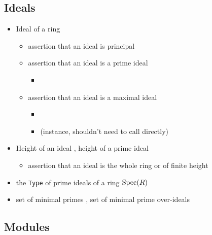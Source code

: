 \subsection{Ideals}

\begin{itemize}
\item
Ideal of a ring 
\begin{itemize}
\item
assertion that an ideal is principal 
\item
assertion that an ideal is a prime ideal 
\begin{itemize}
\item
{}
\end{itemize}
\item
assertion that an ideal is a maximal ideal 
\begin{itemize}
\item
{}
\item
{} (instance, shouldn't need to call directly)
\end{itemize}
\end{itemize}
\item
Height of an ideal ,
height of a prime ideal 
\begin{itemize}
\item
assertion that an ideal is the whole ring or of finite height 
\end{itemize}
\item
the \verb|Type| of prime ideals of a ring ${\mathrm{Spec}}(R)$ 
\item
set of minimal primes ,
set of minimal prime over-ideals 
\end{itemize}

\subsection{Modules}

